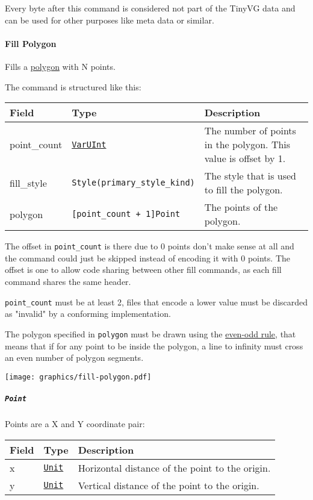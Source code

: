 \documentclass[]{article}
\begin{document}
Every byte after this command is considered not part of the TinyVG data
and can be used for other purposes like meta data or similar.

\hypertarget{fill-polygon}{%
\paragraph{Fill Polygon}\label{fill-polygon}}

Fills a \href{https://en.wikipedia.org/wiki/Polygon}{polygon} with N
points.

The command is structured like this:

\begin{longtable}[]{@{}p{1in}p{2in}p{3in}@{}}
\toprule
Field & Type & Description \\
\midrule
\endhead
point\_count & \protect\hyperlink{varuint}{\texttt{VarUInt}} & The
number of points in the polygon. This value is offset by 1. \\
fill\_style & \texttt{Style(primary\_style\_kind)} & The style that is
used to fill the polygon. \\
polygon & \texttt{{[}point\_count\ +\ 1{]}Point} & The points of the
polygon. \\
\bottomrule
\end{longtable}

The offset in \texttt{point\_count} is there due to 0 points don't make
sense at all and the command could just be skipped instead of encoding
it with 0 points. The offset is one to allow code sharing between other
fill commands, as each fill command shares the same header.

\texttt{point\_count} must be at least 2, files that encode a lower
value must be discarded as "invalid" by a conforming implementation.

The polygon specified in \texttt{polygon} must be drawn using the
\href{https://en.wikipedia.org/wiki/Even\%E2\%80\%93odd_rule}{even-odd
rule}, that means that if for any point to be inside the polygon, a line
to infinity must cross an even number of polygon segments.


\texttt{[image: graphics/fill-polygon.pdf]}

\hypertarget{point}{%
\subparagraph{\texorpdfstring{\texttt{Point}}{Point}}\label{point}}

Points are a X and Y coordinate pair:

\begin{longtable}[]{@{}p{1in}p{2in}p{3in}@{}}
\toprule
Field & Type & Description \\
\midrule
\endhead
x & \protect\hyperlink{units}{\texttt{Unit}} & Horizontal distance of
the point to the origin. \\
y & \protect\hyperlink{units}{\texttt{Unit}} & Vertical distance of the
point to the origin. \\
\bottomrule
\end{longtable}
\end{document}
